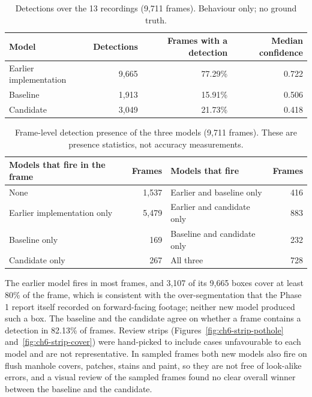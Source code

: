 \begin{table}[!htbp]
\centering
\small
\renewcommand{\arraystretch}{1.15}
\begin{tabular}{|L{4.0cm}|r|r|r|}
\hline
\textbf{Model} & \textbf{Detections} & \textbf{Frames with a detection} & \textbf{Median confidence} \\
\hline
Earlier implementation & 9,665 & 77.29\% & 0.722 \\
\hline
Baseline & 1,913 & 15.91\% & 0.506 \\
\hline
Candidate & 3,049 & 21.73\% & 0.418 \\
\hline
\end{tabular}
\caption{Detections over the 13 recordings (9,711 frames). Behaviour only; no ground truth.}
\label{tab:ch6-totals}
\end{table}

\begin{table}[!htbp]
\centering
\small
\renewcommand{\arraystretch}{1.15}
\begin{tabular}{|L{5.4cm}|r|L{4.6cm}|r|}
\hline
\textbf{Models that fire in the frame} & \textbf{Frames} & \textbf{Models that fire} & \textbf{Frames} \\
\hline
None & 1,537 & Earlier and baseline only & 416 \\
\hline
Earlier implementation only & 5,479 & Earlier and candidate only & 883 \\
\hline
Baseline only & 169 & Baseline and candidate only & 232 \\
\hline
Candidate only & 267 & All three & 728 \\
\hline
\end{tabular}
\caption{Frame-level detection presence of the three models (9,711 frames). These are presence statistics, not accuracy measurements.}
\label{tab:ch6-agreement}
\end{table}

The earlier model fires in most frames, and 3,107 of its 9,665 boxes cover at least 80\% of the frame, which is consistent with the over-segmentation that the Phase 1 report itself recorded on forward-facing footage; neither new model produced such a box. The baseline and the candidate agree on whether a frame contains a detection in 82.13\% of frames. Review strips (Figures~\ref{fig:ch6-strip-pothole} and~\ref{fig:ch6-strip-cover}) were hand-picked to include cases unfavourable to each model and are not representative. In sampled frames both new models also fire on flush manhole covers, patches, stains and paint, so they are not free of look-alike errors, and a visual review of the sampled frames found no clear overall winner between the baseline and the candidate.

